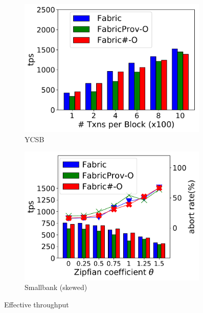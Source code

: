 \begin{figure}[tp]
	\centering
    \begin{subfigure}{0.45\textwidth}
      \includegraphics[width=0.99\textwidth]{chart/provenance/ycsb_thruput.pdf}
      \caption{YCSB}
      \label{chart:provenance:basic:ycsb}
    \end{subfigure}
    \begin{subfigure}{0.45\textwidth}
      \includegraphics[width=0.99\textwidth]{chart/provenance/smallbank_skew.pdf}
      \caption{Smallbank (skewed)}
      \label{chart:provenance:basic:smallbank_skew}
    \end{subfigure}
    \caption{Effective throughput }
    \label{chart:provenance:basic}
\end{figure}

